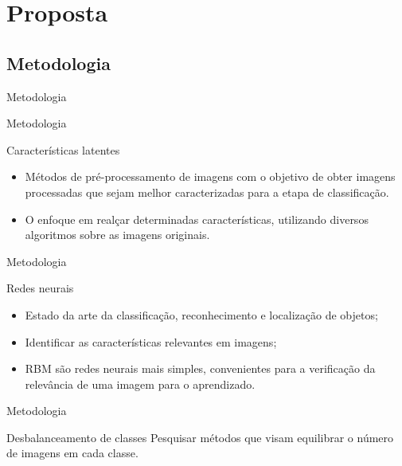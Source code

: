 \documentclass{beamer}
\begin{document}
\section{Proposta}
\subsection{Metodologia}
\begin{frame}{Metodologia}
\end{frame}
\begin{frame}{Metodologia}
\begin{block}{Características latentes}
\justifying
\begin{itemize}
\item Métodos de pré-processamento de imagens com o objetivo de obter imagens processadas que sejam melhor caracterizadas para a etapa de classificação. 
\item O enfoque em realçar determinadas características, utilizando diversos algoritmos sobre as imagens originais.
\end{itemize}
\end{block}
\end{frame}
\begin{frame}{Metodologia}
\begin{block}{Redes neurais}
\justifying
\begin{itemize}
\item Estado da arte da classificação, reconhecimento e localização de objetos;
\item Identificar as características relevantes em imagens;
\item RBM são redes neurais mais simples, convenientes para a verificação da relevância de uma imagem para o aprendizado.
\end{itemize}
\end{block}
\end{frame}
\begin{frame}{Metodologia}
\begin{block}{Desbalanceamento de classes}
\justifying
Pesquisar métodos que visam equilibrar o número de imagens em cada classe.
\end{block}
\end{frame}
\end{document}
